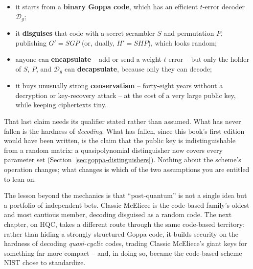 \begin{itemize}
  \item it starts from a \textbf{binary Goppa code}, which has an efficient $t$-error decoder $\mathcal{D}_g$;
  \item it \textbf{disguises} that code with a secret scrambler $S$ and permutation $P$, publishing $G' = SGP$ (or, dually, $H' = SHP$), which looks random;
  \item anyone can \textbf{encapsulate} -- add or send a weight-$t$ error -- but only the holder of $S$, $P$, and $\mathcal{D}_g$ can \textbf{decapsulate}, because only they can decode;
  \item it buys unusually strong \textbf{conservatism} -- forty-eight years without a decryption or key-recovery attack -- at the cost of a very large public key, while keeping ciphertexts tiny.
\end{itemize}

That last claim needs its qualifier stated rather than assumed. What has never fallen is the hardness of \emph{decoding}. What has fallen, since this book's first edition would have been written, is the claim that the public key is indistinguishable from a random matrix: a quasipolynomial distinguisher now covers every parameter set (Section~\ref{sec:goppa-distinguishers}). Nothing about the scheme's operation changes; what changes is which of the two assumptions you are entitled to lean on.

The lesson beyond the mechanics is that ``post-quantum'' is not a single idea but a portfolio of independent bets. Classic McEliece is the code-based family's oldest and most cautious member, decoding disguised as a random code. The next chapter, on HQC, takes a different route through the same code-based territory: rather than hiding a strongly structured Goppa code, it builds security on the hardness of decoding \emph{quasi-cyclic} codes, trading Classic McEliece's giant keys for something far more compact -- and, in doing so, became the code-based scheme NIST chose to standardize.

\printbibliography[heading=chapterrefs]
